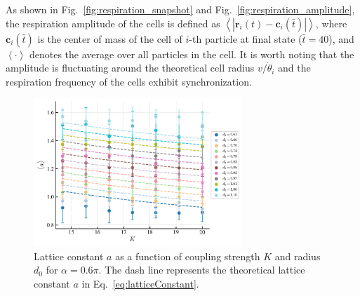 \documentclass{article}
\begin{document}
As shown in Fig.~\ref{fig:respiration_snapshot} and Fig.~\ref{fig:respiration_amplitude}, the respiration amplitude of the cells is defined as $\left< \left| \mathbf{r}_i\left( t \right) -\mathbf{c}_i\left( \bar{t} \right) \right| \right> $, where $\mathbf{c}_i(\bar{t})$ is the center of mass of the cell of $i$-th particle at final state ($\bar{t}=40$), and $\left< \cdot \right>$ denotes the average over all particles in the cell. It is worth noting that the amplitude is fluctuating around the theoretical cell radius $v/\dot{\theta}_i$ and the
respiration frequency of the cells exhibit synchronization.

\begin{figure}[H]
    \centering
    \includegraphics[width=0.7\textwidth]{./figs/lattice_constant.pdf}
    \caption{
        Lattice constant $a$ as a function of coupling strength $K$ and radius $d_0$ for $\alpha=0.6\pi$. The dash line represents the theoretical lattice constant $a$ in Eq.~\eqref{eq:latticeConstant}.
    }
\end{figure}

\end{document}
